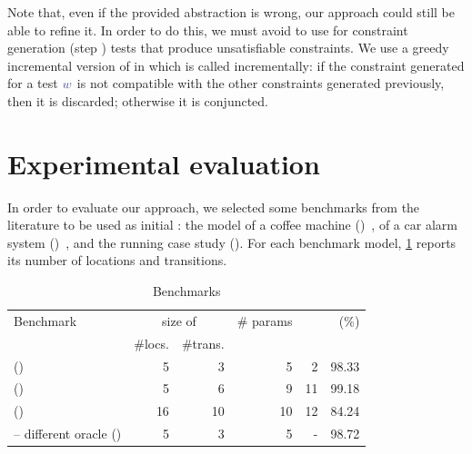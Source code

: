 \begin{tikzborder}{\cite{Gargantini16:validation}}
\begin{tikzborder}{\cite{gargantini_combinatorial_2017}}
\begin{tikzborder}{\cite{garn2019}}
\begin{tikzborder}{\cite{arcaini2019achieving}}
\begin{tikzborder}{\cite{arcaini2019varivolution}}
\begin{tikzborder}{}
Note that, even if the provided abstraction is wrong, our approach could still be able to refine it. In order to do this, we must avoid to use for constraint generation (step ) tests that produce unsatisfiable constraints. We use a greedy incremental version of \genConstr in which \replayTW{} is called incrementally: if the constraint generated for a test $\word$ is not compatible with the other constraints generated previously, then it is discarded; otherwise it is conjuncted.
\end{tikzborder}

\section{Experimental evaluation}\label{sec:evaluation2}

\begin{tikzborder}{}
In order to evaluate our approach, we selected some benchmarks from the literature to be used as initial \ta \initTa: the model of a coffee machine (\benchmarkCoffeeShort)~\cite{aichernig2013time}, of a car alarm system (\benchmarkCarAlarmShort)~\cite{aichernig2013time}, and the running case study (\benchmarkExampleShort). For each benchmark model, \ref{table:benchmarks1} reports its number of locations and transitions.
\be

%
\begin{table}[!htb]
	\centering
	\caption{Benchmarks}
	\label{table:benchmarks1}
	\setlength\tabcolsep{4pt}
	\begin{tabular}{lrrrrr}
		\toprule
		Benchmark & \multicolumn{2}{c}{size of \initTa } & \# params & \syntDist & \semConf (\%)\\
		\cline{2-3}
		& \#locs. & \#trans.\\
		\midrule
		\benchmarkExample (\benchmarkExampleShort) & 5 & 3 & 5 & 2 & 98.33\\
		\hline
		\benchmarkCoffee (\benchmarkCoffeeShort) & 5 & 6 & 9 & 11 & 99.18\\
		\hline
		\benchmarkCarAlarm (\benchmarkCarAlarmShort) & 16 & 10 & 10 & 12 & 84.24\\
		\hline
		\hline
		\benchmarkExample{} -- different oracle (\benchmarkExampleShortAlt) & 5 & 3 & 5 & - & 98.72\\
		\bottomrule
	\end{tabular}
\end{table}


\end{tikzborder}
\end{tikzborder}
\end{tikzborder}
\end{tikzborder}
\end{tikzborder}
\end{tikzborder}
